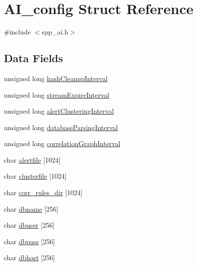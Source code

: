 \hypertarget{structAI__config}{
\section{AI\_\-config Struct Reference}
\label{structAI__config}
}


{\ttfamily \#include $<$spp\_\-ai.h$>$}

\subsection*{Data Fields}
\begin{DoxyCompactItemize}
\item 
unsigned long \hyperlink{structAI__config_a9f7680615027d4fb74b4aa144a7028a4}{hashCleanupInterval}
\item 
unsigned long \hyperlink{structAI__config_abbe77d5f94b8c5164bea47acba09c98b}{streamExpireInterval}
\item 
unsigned long \hyperlink{structAI__config_a7d0d098b8263aa3d8415b11d1ec7f93d}{alertClusteringInterval}
\item 
unsigned long \hyperlink{structAI__config_ae6ca715cab1d90b70c3aad443133c263}{databaseParsingInterval}
\item 
unsigned long \hyperlink{structAI__config_aa736375e57a59936e2e782b7cd200e41}{correlationGraphInterval}
\item 
char \hyperlink{structAI__config_a2efa9590d7eea6dce8b5dd9aa76ed8ca}{alertfile} \mbox{[}1024\mbox{]}
\item 
char \hyperlink{structAI__config_a6da02a3f7116fd3810a41b738e8883a3}{clusterfile} \mbox{[}1024\mbox{]}
\item 
char \hyperlink{structAI__config_ab7ea93bbe72b85c4019b4f5656ad62fc}{corr\_\-rules\_\-dir} \mbox{[}1024\mbox{]}
\item 
char \hyperlink{structAI__config_ac8a93607f12106e2f5c9b43af27107da}{dbname} \mbox{[}256\mbox{]}
\item 
char \hyperlink{structAI__config_aa004adebfdafb6d14092aecd7f4912b0}{dbuser} \mbox{[}256\mbox{]}
\item 
char \hyperlink{structAI__config_aa1cda349763faf60b2ebdbf2d187ae7d}{dbpass} \mbox{[}256\mbox{]}
\item 
char \hyperlink{structAI__config_a8e56f1a1b2095d3d329c8068ea0f3aab}{dbhost} \mbox{[}256\mbox{]}
\end{DoxyCompactItemize}


